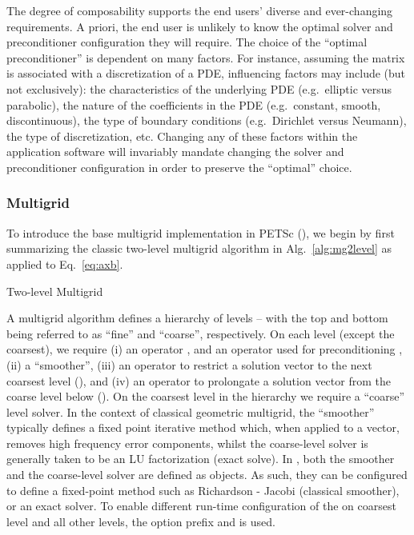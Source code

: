 \documentclass[]{siamart0216}
\begin{document}
The degree of composability supports the end users' diverse and ever-changing requirements. 
A priori, the end user is unlikely to know the optimal solver and preconditioner configuration they will require. 
The choice of the ``optimal preconditioner'' is dependent on many factors. For instance, assuming the matrix 
is associated with a discretization of a PDE, influencing factors may include (but not exclusively): 
the characteristics of the underlying PDE (e.g.~elliptic versus parabolic), 
the nature of the coefficients in the PDE (e.g.~constant, smooth, discontinuous), 
the type of boundary conditions (e.g.~Dirichlet versus Neumann), 
the type of discretization, etc.
Changing any of these factors within the application software will invariably 
mandate changing the solver and preconditioner configuration in order to preserve the ``optimal'' choice.

\subsubsection{Multigrid}
To introduce the base multigrid implementation in PETSc (), we begin by 
first summarizing the classic two-level multigrid algorithm in Alg.~\ref{alg:mg2level} 
as applied to Eq.~\eqref{eq:axb}.
\begin{algorithm}
\caption{Two-level Multigrid}\label{alg:mg2level}
\begin{algorithmic}[1]
\Repeat
\State 
{}
\State 
{}
\State 
{} 
\State 
{} 
\State 
{}
\State 
{}
\end{algorithmic}
\end{algorithm}

A multigrid algorithm defines a hierarchy of levels -- with the top and bottom being referred to as ``fine'' 
and ``coarse'', respectively.
On each level (except the coarsest), we require 
(i) an operator , and an operator used for preconditioning ,
(ii) a ``smoother'',
(iii) an operator to restrict a solution vector to the next coarsest level (), and
(iv) an operator to prolongate a solution vector from the coarse level below ().
On the coarsest level in the hierarchy we require a ``coarse'' level solver.
In the context of classical geometric multigrid, the ``smoother'' typically defines a fixed point iterative method which, 
when applied to a vector, removes high frequency error components, whilst the coarse-level solver is 
generally taken to be an LU factorization (exact solve).
In , both the smoother and the coarse-level solver are defined as  objects. 
As such, they can be configured to define a fixed-point method such as Richardson - Jacobi (classical smoother), or 
an exact solver. To enable different run-time configuration of the  on coarsest level and all other levels, the 
option prefix  and  is used.
\end{document}
